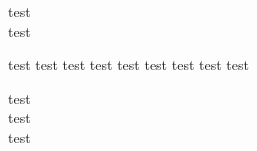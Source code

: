 \documentclass[logo,
									cna,
									date = 01.09.2020,
									classe = 6G]{exam}
\begin{document}
	
	\begin{quest}
		test\\
		test
	\end{quest}

\begin{quest}
	\begin{questionEnum}
		\task[\oneStar{4}] test  
		\task[\twoStar{4}] test  
		\task[\threeStar{4}] test  
		\task[\oneStar{4}] test  
		\task[\noStar{4}] test  
		\task[\threeStar{4}] test
		\task[\oneStar{4}] test
		\task[\twoStar{4}] test
		\task[\threeStar{4}] test
	\end{questionEnum}
\end{quest}

\begin{quest}
	test\\
	test\\
	test
\end{quest}
\end{document}
